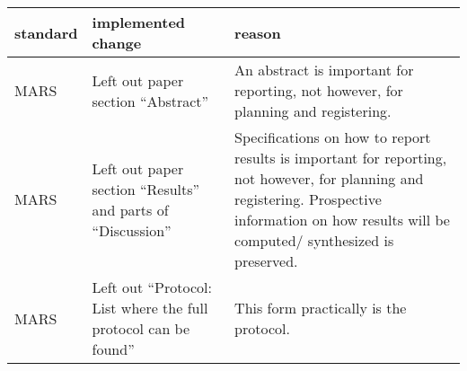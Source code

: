 \documentclass[
]{article}
\begin{document}
\hypertarget{changes}{}
\begin{collapse}

\begin{longtable}[]{@{}lll@{}}
\toprule
\begin{minipage}[b]{0.15\columnwidth}\raggedright
standard\strut
\end{minipage} & \begin{minipage}[b]{0.33\columnwidth}\raggedright
implemented change\strut
\end{minipage} & \begin{minipage}[b]{0.43\columnwidth}\raggedright
reason\strut
\end{minipage}\tabularnewline
\midrule
\endhead
\begin{minipage}[t]{0.15\columnwidth}\raggedright
MARS\strut
\end{minipage} & \begin{minipage}[t]{0.33\columnwidth}\raggedright
Left out paper section ``Abstract''\strut
\end{minipage} & \begin{minipage}[t]{0.43\columnwidth}\raggedright
An abstract is important for reporting, not however, for planning and
registering.\strut
\end{minipage}\tabularnewline
\begin{minipage}[t]{0.15\columnwidth}\raggedright
MARS\strut
\end{minipage} & \begin{minipage}[t]{0.33\columnwidth}\raggedright
Left out paper section ``Results'' and parts of ``Discussion''\strut
\end{minipage} & \begin{minipage}[t]{0.43\columnwidth}\raggedright
Specifications on how to report results is important for reporting, not
however, for planning and registering. Prospective information on how
results will be computed/ synthesized is preserved.\strut
\end{minipage}\tabularnewline
\begin{minipage}[t]{0.15\columnwidth}\raggedright
MARS\strut
\end{minipage} & \begin{minipage}[t]{0.33\columnwidth}\raggedright
Left out ``Protocol: List where the full protocol can be found''\strut
\end{minipage} & \begin{minipage}[t]{0.43\columnwidth}\raggedright
This form practically is the protocol.\strut
\end{minipage}\tabularnewline

\end{longtable}
\end{collapse}
\end{document}
